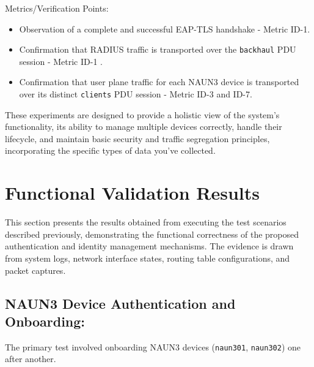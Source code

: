 Metrics/Verification Points:
\begin{itemize}
    \item Observation of a complete and successful \ac{EAP-TLS} handshake - Metric ID-1.
    \item Confirmation that \ac{RADIUS} traffic is transported over the \texttt{backhaul} \ac{PDU} session - Metric ID-1 .
    \item Confirmation that user plane traffic for each \ac{NAUN3} device is transported over its distinct \texttt{clients} \ac{PDU} session - Metric ID-3 and ID-7.
\end{itemize}

These experiments are designed to provide a holistic view of the system's functionality, its ability to manage multiple devices correctly, handle their lifecycle, and maintain basic security and traffic segregation principles, incorporating the specific types of data you've collected.

\section{Functional Validation Results}

This section presents the results obtained from executing the test scenarios described previously, demonstrating the functional correctness of the proposed authentication and identity management mechanisms. The evidence is drawn from system logs, network interface states, routing table configurations, and packet captures.

\subsection{\acs{NAUN3} Device Authentication and Onboarding:}
The primary test involved onboarding \ac{NAUN3} devices (\texttt{naun301}, \texttt{naun302}) one after another.

